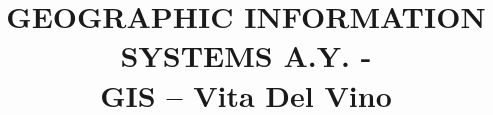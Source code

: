 \usepackage[margin=25mm]{geometry}
\usepackage{titlesec}
\usepackage{xcolor}
\usepackage{longtable}
\usepackage{graphicx}
\usepackage{advdate}
\usepackage{cmbright}
\usepackage{array}
\usepackage{makecell}



\usepackage{sectsty}
\setcounter{secnumdepth}{0}
\allsectionsfont{\sffamily\color{UnipdRed}}


\usepackage{fancyhdr}
\pagestyle{fancy}
\renewcommand{\headrulewidth}{0pt}
\renewcommand{\footrulewidth}{0pt}
\setlength\headheight{80.0pt}
\addtolength{\textheight}{-80.0pt}
\cfoot{}



\makeatletter         
\renewcommand\maketitle{
{\raggedright 
\begin{center}

{   
    \Large\bfseries\sffamily 
    \@title}\\[4ex] 
    \Large
    \textbf{Master Degree in Computer Engineering\\
    Master Degree in Cybersecurity\\
    Master Degree in ICT for Internet and Multimedia\\}
    \large
    \vspace{\baselineskip}
    \deadline{28 April}
    \vspace{30mm}
    
    \end{center}}
    \thispagestyle{fancy}
    \pagebreak
    \pagestyle{plain}
    \setlength\headheight{25.0pt}
    \addtolength{\textheight}{-25.0pt}
}
\makeatother


\newcommand{\hw}{GIS – Vita Del Vino}


\title{
    GEOGRAPHIC INFORMATION SYSTEMS A.Y. \AdvanceDate[-365]\the\year{}-\AdvanceDate[365]\the\year{}\\
\vspace*{0.5\baselineskip}
\hw}






